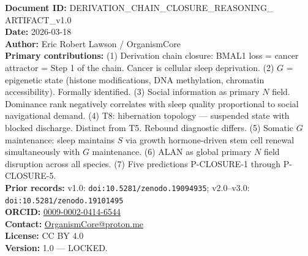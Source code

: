 \documentclass[10pt, a4paper]{article}
\begin{document}
{\footnotesize
\textbf{Document ID:}
DERIVATION\_CHAIN\_CLOSURE\_REASONING\_
ARTIFACT\_v1.0\\
\textbf{Date:} 2026-03-18\\
\textbf{Author:} Eric Robert Lawson /
OrganismCore\\
\textbf{Primary contributions:}
(1) Derivation chain closure: BMAL1 loss
= cancer attractor = Step 1 of the chain.
Cancer is cellular sleep deprivation.
(2) $G$ = epigenetic state (histone
modifications, DNA methylation, chromatin
accessibility). Formally identified.
(3) Social information as primary $N$
field. Dominance rank negatively
correlates with sleep quality proportional
to social navigational demand.
(4) T8: hibernation topology ---
suspended state with blocked discharge.
Distinct from T5. Rebound diagnostic
differs.
(5) Somatic $G$ maintenance: sleep
maintains $S$ via growth hormone-driven
stem cell renewal simultaneously with
$G$ maintenance.
(6) ALAN as global primary $N$ field
disruption across all species.
(7) Five predictions P-CLOSURE-1
through P-CLOSURE-5.\\
\textbf{Prior records:}
v1.0: \texttt{doi:10.5281/zenodo.19094935};
v2.0--v3.0:
\texttt{doi:10.5281/zenodo.19101495}\\
\textbf{ORCID:}
\href{https://orcid.org/0009-0002-0414-6544}
{0009-0002-0414-6544}\\
\textbf{Contact:}
\href{mailto:OrganismCore@proton.me}
{OrganismCore@proton.me}\\
\textbf{License:} CC BY 4.0\\
\textbf{Version:} 1.0 --- LOCKED.
}
\end{document}
